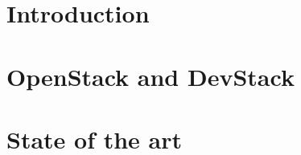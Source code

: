 \documentclass[12pt,a4paper,twoside,openright]{report}
\makeatletter
\def\cleardoublepage{\clearpage\if@twoside \ifodd\c@page\else
\hbox{}
\vspace*{\fill}
\begin{center}
\end{center}
\vspace{\fill}
\thispagestyle{empty}
\newpage
\if@twocolumn\hbox{}\newpage\fi\fi\fi}
\makeatother
\begin{document}
\setcounter{page}{1}
\pagestyle{empty}

\lstset{
	frame=tb,
	captionpos=b,
	basicstyle=\footnotesize,
	numbers=left,
	aboveskip=1em
}



\pagestyle{fancy}
\renewcommand{\contentsname}{Table of Contents}%

\tableofcontents
\cleardoublepage
\listoffigures
\listoftables


\setcounter{page}{1}

\chapter{Introduction}
\label{chap:intro}


\chapter{OpenStack and DevStack}
\label{chap:openstack_devstack}


\chapter{State of the art}
\label{chap:sota}

\end{document}
